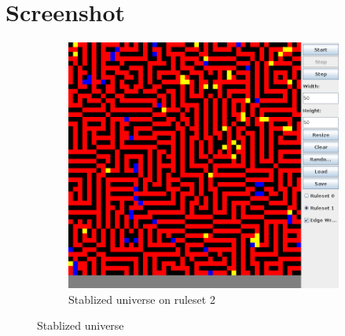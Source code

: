 \documentclass[12pt,a4paper]{article}
\begin{document}
\newpage
\section{Screenshot}
\begin{figure}[h!]
        \centering
        \begin{subfigure}[b]{0.5\textwidth}
                \includegraphics[width=\textwidth]{r2out}
                \caption{Stablized universe on ruleset 2}
                \label{fig:r2out}
        \end{subfigure}

        \caption{Stablized universe}
\end{figure}
\end{document}
